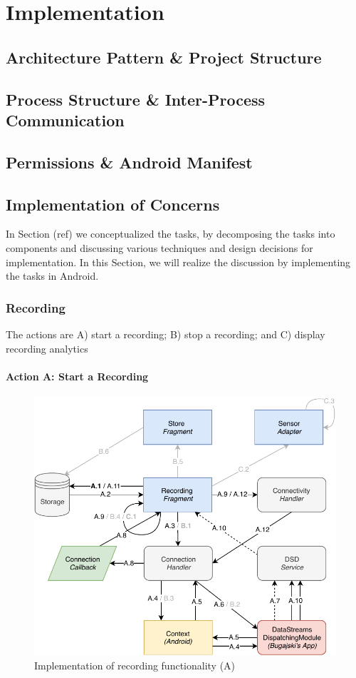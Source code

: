\chapter{Implementation}

\section{Architecture Pattern \& Project Structure}
\section{Process Structure \& Inter-Process Communication}
\section{Permissions \& Android Manifest}

\section{Implementation of Concerns}
In Section (ref) we conceptualized the tasks, by decomposing the tasks into components and discussing various techniques and design decisions for implementation. In this Section, we will realize the discussion by implementing the tasks in Android. 

\subsection{Recording}

The actions are A) start a recording; B) stop a recording; and C) display recording analytics

\subsubsection{Action A: Start a Recording}
\begin{figure}
    \centering
    \includegraphics[scale=0.7]{images/Recording_ImpA.pdf}
    \caption{Implementation of recording functionality (A)}
    \label{fig:impl_recordingA}
\end{figure}

